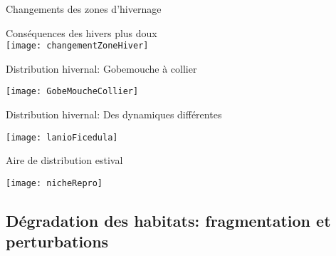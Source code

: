 \documentclass[10pt]{beamer}
\begin{document}
\begin{frame}{Changements des zones d’hivernage}
  \begin{center}
   Conséquences des hivers plus doux \\
  \vspace{10pt}
  \texttt{[image: changementZoneHiver]}
  \end{center}
\end{frame}

\begin{frame}{Distribution hivernal: Gobemouche à collier}
  \begin{center}
   \texttt{[image: GobeMoucheCollier]}
  \end{center}
\end{frame}

\begin{frame}{Distribution hivernal: Des dynamiques différentes}
  \begin{center}
   \texttt{[image: lanioFicedula]}
  \end{center}
\end{frame}

\begin{frame}{Aire de distribution estival}
  \begin{center}
   \texttt{[image: nicheRepro]}
  \end{center}

\end{frame}


\subsection{Dégradation des habitats: fragmentation et perturbations}
\end{document}
